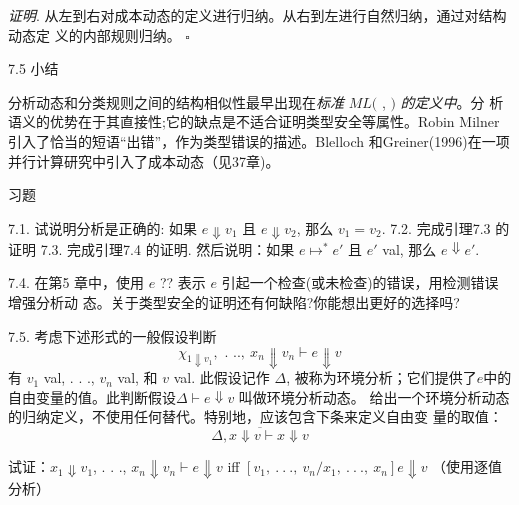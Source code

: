 {\it 证明}. 从左到右对成本动态的定义进行归纳。从右到左进行自然归纳，通过对结构动态定
义的内部规则归纳。 $\square $

7.5 小结

分析动态和分类规则之间的结构相似性最早出现在{\it 标准} $ML ($ , $)$ {\it 的定义中}。分
析语义的优势在于其直接性;它的缺点是不适合证明类型安全等属性。Robin Milner 引入了恰当的短语“出错”，作为类型错误的描述。Blelloch 和Greiner(1996)在一项并行计算研究中引入了成本动态（见37章)。

习题

7.1. 试说明分析是正确的:  如果 $e\Downarrow v_{1}$ 且 $e\Downarrow v_{2}$, 那么 $v_{1} =v_{2}.$
7.2.  完成引理7.3 的证明 
7.3.  完成引理7.4 的证明.  然后说明：如果 $e\mapsto^{*}e'$ 且 $e'$ val, 那么 $e\Downarrow e'.$

7.4. 在第5 章中，使用 $e$ ?? 表示 $e$ 引起一个检查(或未检查)的错误，用检测错误增强分析动
态。关于类型安全的证明还有何缺陷?你能想出更好的选择吗? 

7.5. 考虑下述形式的一般假设判断
$$
\chi_{1\Downarrow v_{1}},\text{ . }..,\ x_{n}\Downarrow v_{n}\vdash e\Downarrow v
$$
有 $v_{1}$ val, . . ., $v_{n}$ val, 和 $v$ val. 此假设记作 $\Delta$, 被称为环境分析；它们提供了$e$中的自由变量的值。此判断假设$\Delta\vdash e\Downarrow v$ 叫做环境分析动态。
给出一个环境分析动态的归纳定义，不使用任何替代。特别地，应该包含下条来定义自由变
量的取值：
$$
\overline{\Delta,x\Downarrow v\vdash x\Downarrow v}
$$

试证：$x_{1} \Downarrow v_{1}$, . . ., $x_{n} \Downarrow v_{n} \vdash e \Downarrow v$ iff $[v_{1},\ .\ .\ .,\ v_{n}/x_{1},\ .\ .\ .,\ x_{n}]e \Downarrow v$ （使用逐值分析）
